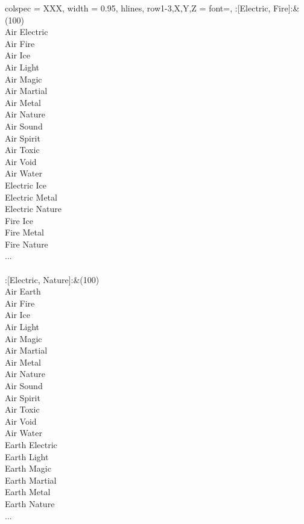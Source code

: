 \begin{longtblr}[
	caption = {2v2 Attacking Effective},
	label = {2v2-Attacking-Effective},
]{
	colspec = {XXX}, width = 0.95\linewidth,
	hlines,
	row{1-3,X,Y,Z} = {font=\bfseries},
}
	:[Electric, Fire]:&{(100)\\
	Air Electric \\
	Air Fire \\
	Air Ice \\
	Air Light \\
	Air Magic \\
	Air Martial \\
	Air Metal \\
	Air Nature \\
	Air Sound \\
	Air Spirit \\
	Air Toxic \\
	Air Void \\
	Air Water \\
	Electric Ice \\
	Electric Metal \\
	Electric Nature \\
	Fire Ice \\
	Fire Metal \\
	Fire Nature \\
	...\\
	}\\

	:[Electric, Nature]:&{(100)\\
	Air Earth \\
	Air Fire \\
	Air Ice \\
	Air Light \\
	Air Magic \\
	Air Martial \\
	Air Metal \\
	Air Nature \\
	Air Sound \\
	Air Spirit \\
	Air Toxic \\
	Air Void \\
	Air Water \\
	Earth Electric \\
	Earth Light \\
	Earth Magic \\
	Earth Martial \\
	Earth Metal \\
	Earth Nature \\
	...\\
	}\\


\end{longtblr}
